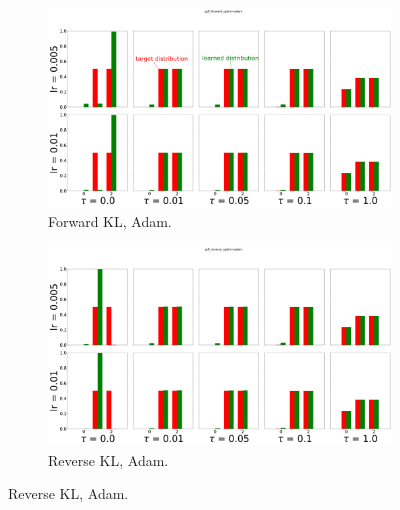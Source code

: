 \documentclass{article}
\begin{document}

\begin{figure}[!ht]
  \centering
  \begin{subfigure}[b]{0.4\linewidth}
    \centering
    \includegraphics[width=1\columnwidth]{figs/discrete-bandit/notlearnQ/adam/pdf-adam.png}
    \caption{Forward KL, Adam.}
    \label{fig:discrete-bandit-pdf-forward-adam}
  \end{subfigure}%
  \begin{subfigure}[b]{0.4\linewidth}
    \centering
    \includegraphics[width=1\columnwidth]{figs/discrete-bandit/notlearnQ/adam/pdf_reverse_optim=adam.png}
    \caption{Reverse KL, Adam. }
    \label{fig:discrete-bandit-pdf-reverse-adam}
  \end{subfigure}
  

\end{figure}
\end{document}
